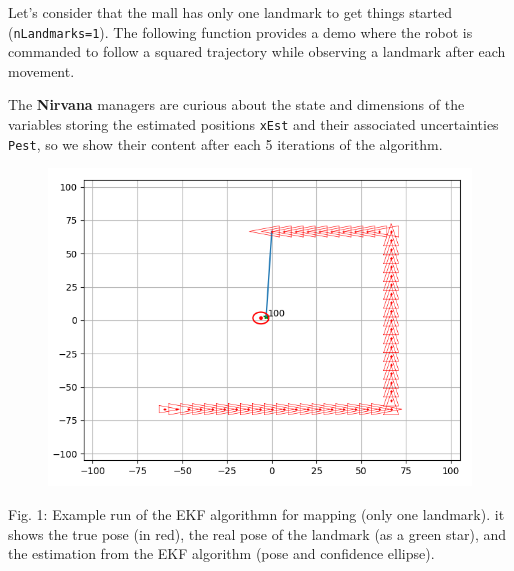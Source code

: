\documentclass[11pt]{article}
\begin{document}
Let's consider that the mall has only one landmark to get things started
(\texttt{nLandmarks=1}). The following function provides a demo where
the robot is commanded to follow a squared trajectory while observing a
landmark after each movement.

The \textbf{{Nirvana}} managers are curious about the state and
dimensions of the variables storing the estimated positions
\texttt{xEst} and their associated uncertainties \texttt{Pest}, so we
show their content after each 5 iterations of the algorithm.

\begin{figure}
\centering
\includegraphics{fig6-1-2.png}
\end{figure}

Fig. 1: Example run of the EKF algorithmn for mapping (only one
landmark). it shows the true pose (in red), the real pose of the
landmark (as a green star), and the estimation from the EKF algorithm
(pose and confidence ellipse).
\end{document}

